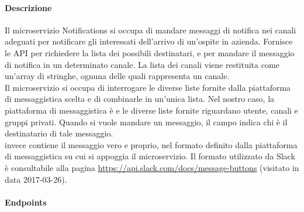 \paragraph{Descrizione}
Il microservizio Notifications si occupa di mandare messaggi di notifica nei canali adeguati per notificare gli interessati dell'arrivo di un'ospite in azienda. Fornisce le API per richiedere la lista dei possibili destinatari, e per mandare il messaggio di notifica in un determinato canale. La lista dei canali viene restituita come un'array di stringhe, ognuna delle quali rappresenta un canale.\\
Il microservizio si occupa di interrogare le diverse liste fornite dalla piattaforma di messaggistica scelta e di combinarle in un'unica lista. Nel nostro caso, la piattaforma di messaggistica è  e le diverse liste fornite riguardano utente, canali e gruppi privati. Quando si vuole mandare un messaggio, il campo  indica chi è il destinatario di tale messaggio.\\  invece contiene il messaggio vero e proprio, nel formato definito dalla piattaforma di messaggistica su cui si appoggia il microservizio. Il formato utilizzato da Slack è consultabile alla pagina \url{https://api.slack.com/docs/message-buttons} (visitato in data 2017-03-26).
\paragraph{Endpoints}

